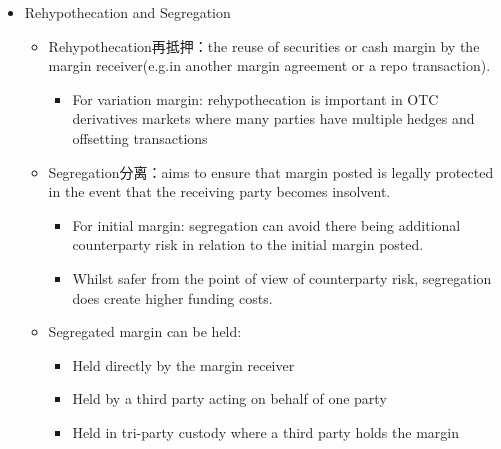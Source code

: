 \begin{itemize}
\begin{itemize}
\end{itemize}



\item Rehypothecation and Segregation
\begin{itemize}
    \item Rehypothecation再抵押：the reuse of securities or cash margin by the margin receiver(e.g.in another margin
    agreement or a repo transaction).
    \begin{itemize}
    \item For variation margin: rehypothecation is important in OTC derivatives markets where many parties have multiple hedges and offsetting transactions
    \end{itemize}

\item Segregation分离：aims to ensure that margin posted is legally protected in the event that the receiving party becomes insolvent.
\begin{itemize}
\item For initial margin: segregation can avoid there being additional counterparty risk in relation to the initial margin posted.
\item Whilst safer from the point of view of counterparty risk, segregation does create higher funding costs.
\end{itemize}

\item Segregated margin can be held:
\begin{itemize}
\item Held directly by the margin receiver
\item Held by a third party acting on behalf of one party
\item Held in tri-party custody where a third party holds the margin
\end{itemize}




\end{itemize}  



\end{itemize}
